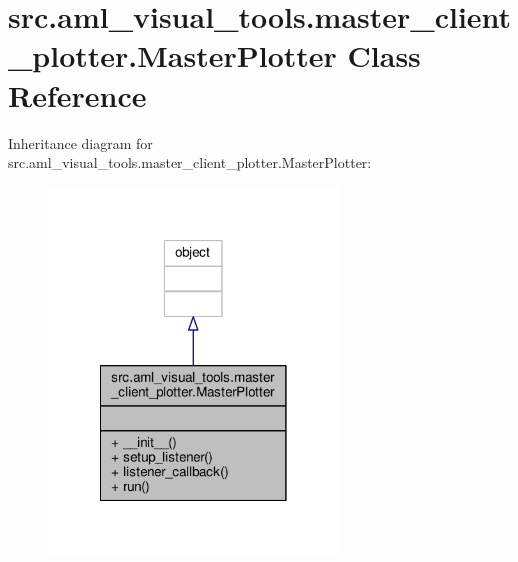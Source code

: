 \hypertarget{classsrc_1_1aml__visual__tools_1_1master__client__plotter_1_1_master_plotter}{\section{src.\-aml\-\_\-visual\-\_\-tools.\-master\-\_\-client\-\_\-plotter.\-Master\-Plotter Class Reference}
\label{classsrc_1_1aml__visual__tools_1_1master__client__plotter_1_1_master_plotter}
}


Inheritance diagram for src.\-aml\-\_\-visual\-\_\-tools.\-master\-\_\-client\-\_\-plotter.\-Master\-Plotter\-:
\nopagebreak
\begin{figure}[H]
\begin{center}
\leavevmode
\includegraphics[width=218pt]{classsrc_1_1aml__visual__tools_1_1master__client__plotter_1_1_master_plotter__inherit__graph}
\end{center}
\end{figure}


